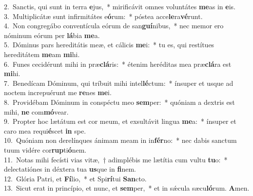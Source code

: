 {2.~}Sanctis, qui sunt in terra \textbf{e}jus,~* mirificávit omnes voluntátes \textbf{me}as in \textbf{e}is.\\
{3.~}Multiplicátæ sunt infirmitátes e\textbf{ó}rum:~* póstea acce\textbf{le}ra\textbf{vé}runt.\\
{4.~}Non congregábo conventícula eórum de san\textbf{guí}nibus,~* nec memor ero nóminum eórum per \textbf{lá}bia \textbf{me}a.\\
{5.~}Dóminus pars hereditátis meæ, et cálicis \textbf{me}i:~* tu es, qui restítues hereditátem \textbf{me}am \textbf{mi}hi.\\
{6.~}Funes cecidérunt mihi in præ\textbf{clá}ris:~* étenim heréditas mea præ\textbf{clá}ra est \textbf{mi}hi.\\
{7.~}Benedícam Dóminum, qui tríbuit mihi intel\textbf{lé}ctum:~* ínsuper et usque ad noctem increpuérunt me \textbf{re}nes \textbf{me}i.\\
{8.~}Providébam Dóminum in conspéctu meo \textbf{sem}per:~* quóniam a dextris est mihi, \textbf{ne} com\textbf{mó}vear.\\
{9.~}Propter hoc lætátum est cor meum, et exsultávit lingua \textbf{me}a:~* ínsuper et caro mea requi\textbf{é}scet \textbf{in} spe.\\
{10.~}Quóniam non derelínques ánimam meam in in\textbf{fér}no:~* nec dabis sanctum tuum vidére cor\textbf{rup}ti\textbf{ó}nem.\\
{11.~}Notas mihi fecísti vias vitæ,~† adimplébis me lætítia cum vultu \textbf{tu}o:~* delectatiónes in déxtera tua \textbf{us}que in \textbf{fi}nem.\\
{12.~}Glória Patri, et \textbf{Fí}lio,~* et Spi\textbf{rí}tui \textbf{San}cto.\\
{13.~}Sicut erat in princípio, et nunc, et \textbf{sem}per,~* et in sǽcula sæcu\textbf{ló}rum. \textbf{A}men.\\

